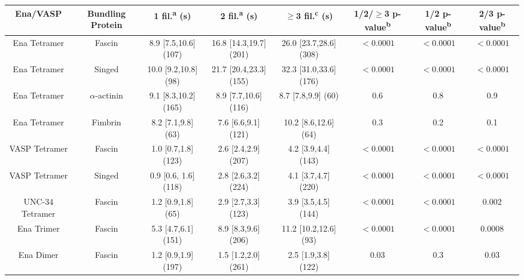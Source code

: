 \begin{table}[hbtp]
\footnotesize
\centering 
\begin{tabulary}{.9\textwidth}{C C C C C C C C}
\toprule 
Ena/VASP & Bundling Protein & 1 fil.\textsuperscript{a} (s) &  2 fil.\textsuperscript{a} (s) & $\geq$3 fil.\textsuperscript{c} (s) & 1/2/$\geq$3 p-value\textsuperscript{b} & 1/2 p-value\textsuperscript{b} & 2/3 p-value\textsuperscript{b} \\ 
\midrule 
Ena Tetramer & Fascin & 8.9 [7.5,10.6] (107) & 16.8 [14.3,19.7] (201) & 26.0 [23.7,28.6] (308) & ${<0.0001}$ & ${<0.0001}$ & ${<0.0001}$ \\ 
Ena Tetramer & Singed & 10.0 [9.2,10.8] (98) & 21.7 [20.4,23.3] (155) & 32.3 [31.0,33.6] (176) & ${<0.0001}$ & ${<0.0001}$ & ${<0.0001}$ \\ 
Ena Tetramer & $\alpha$-actinin & 9.1 [8.3,10.2] (165) & 8.9 [7.7,10.6] (116) & 8.7\hspace{0.1cm} [7.8,9.9] (60) & 0.6 & 0.8 & 0.9 \\
Ena Tetramer & Fimbrin & 8.2\hspace{0.8cm} [7.1,9.8] (63) & 7.6\hspace{0.1cm} [6.6,9.1] (121) & 10.2 [8.6,12.6] (64) & 0.3 & 0.2 & 0.1\\
VASP Tetramer & Fascin & 1.0\hspace{0.8cm} [0.7,1.8] (123) & 2.6\hspace{0.1cm} [2.4,2.9] (207) & 4.2\hspace{0.1cm} [3.9,4.4] (143) & ${<0.0001}$ & ${<0.0001}$ & ${<0.0001}$\\
VASP Tetramer & Singed & 0.9\hspace{0.8cm} [0.6, 1.6] (118) & 2.8\hspace{0.1cm} [2.6,3.2] (224) & 4.1\hspace{0.1cm} [3.7,4.7] (220) & ${<0.0001}$ & ${<0.0001}$ & ${<0.0001}$ \\
UNC-34 Tetramer & Fascin & 1.2\hspace{0.8cm} [0.9,1.8] (65) & 2.9\hspace{0.1cm} [2.7,3.3] (123) & 3.9\hspace{0.1cm} [3.5,4.5] (144) & ${<0.0001}$ & ${<0.0001}$ & 0.002 \\
Ena Trimer & Fascin & 5.3\hspace{0.8cm} [4.7,6.1] (151) & 8.9\hspace{0.1cm} [8.3,9.6] (206) & 11.2 [10.2,12.6] (93) & ${<0.0001}$ & ${<0.0001}$ & 0.0008\\
Ena Dimer & Fascin & 1.2\hspace{0.8cm} [0.9,1.9] (197) & 1.5\hspace{0.1cm} [1.2,2.0] (261) & 2.5\hspace{0.1cm} [1.9,3.8] (122) & 0.03 & 0.3 & 0.03 \\

\end{tabulary}
\end{table}
